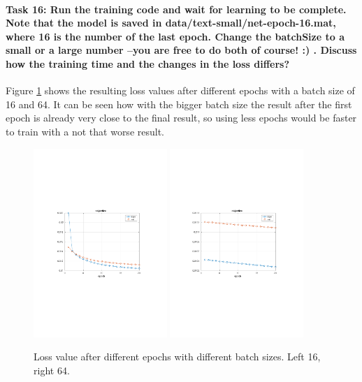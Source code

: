 \documentclass[12pt]{article}
\begin{document}
\paragraph{Task 16: Run the training code and wait for learning to be complete. Note that the model is saved in	data/text-small/net-epoch-16.mat, where 16 is the number of the last epoch. Change the batchSize to a small or a large number –you are free to do both of course! :) . Discuss how the training time and the changes in the loss differs?} Figure \ref{fig:33} shows the resulting loss values after different epochs with a batch size of 16 and 64. It can be seen how with the bigger batch size the result after the first epoch is already very close to the final result, so using less epochs would be faster to train with a not that worse result.

\begin{figure}[htbp]
 \centering
\includegraphics[width=0.45\textwidth]{33b}
\includegraphics[width=0.45\textwidth]{33a}
\caption{Loss value after different epochs with different batch sizes. Left 16, right 64.}
 \label{fig:33}
\end{figure}
\end{document}
